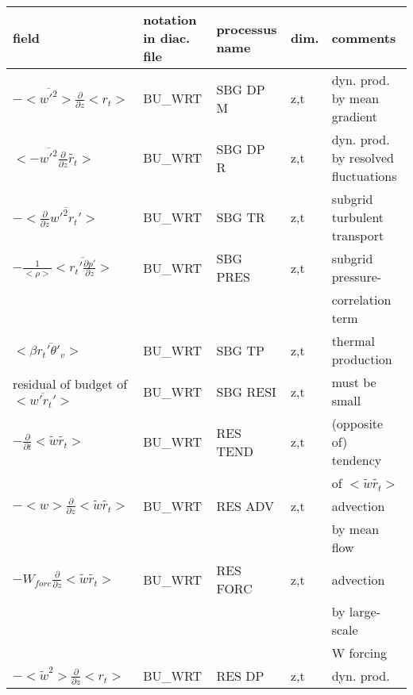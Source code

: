 \begin{center}
\begin{tabular}{||p{5cm}|>{\centering}p{2cm}|>{\centering}p{2.5cm}|>{\centering}p{0.5cm}|p{5.5cm }||}
\hline
\hline
field & notation in diac. file & processus name& dim.  & comments \\
\hline
\hline
$-<\overline{w'^2}>\frac{\partial }{\partial z}<r_t>$ & BU\_WRT & SBG DP M & z,t & dyn. prod. by mean gradient \\
\hline
$<-\overline{w'^2}\frac{\partial}{\partial z}\tilde{r_t}>$ & BU\_WRT & SBG DP R & z,t & dyn. prod. by resolved fluctuations\\
\hline
$-<\frac{\partial}{\partial z}\overline{w'^2r_t'}>$ & BU\_WRT & SBG TR   & z,t & subgrid turbulent transport\\
\hline
$- \frac{1}{<\rho>}<\overline{r_t' \frac{\partial p'}{\partial z}}>$&
BU\_WRT & SBG PRES & z,t & subgrid pressure-\\
 & & & &correlation term \\
\hline
$<\beta  \overline{r_t'\theta'_v}>$ & BU\_WRT & SBG TP   & z,t & thermal production \\
\hline
{\rm residual of budget of} $<\overline{w'r_t'}>$ & BU\_WRT & SBG RESI & z,t & must be small \\
\hline
%
$-\frac{\partial }{\partial t}<\tilde{w}\tilde{r_t}>$ & BU\_WRT & RES TEND & z,t & (opposite of) tendency\\
 & & & &of $<\tilde{w}\tilde{r_t}>$\\
\hline
$-<w>\frac{\partial}{\partial z}<\tilde{w}\tilde{r_t}>$ & BU\_WRT & RES ADV  & z,t & advection \\
 & & & & by mean flow\\
\hline
$-W_{forc}\frac{\partial}{\partial z}<\tilde{w}\tilde{r_t}>$ & BU\_WRT & RES FORC & z,t & advection \\
 & & & & by large-scale \\
 & & & & W forcing\\
\hline
$-<\tilde{w}^2>\frac{\partial }{\partial z}<r_t>$ & BU\_WRT & RES DP   & z,t & dyn. prod.\\

\end{tabular}
\end{center}
